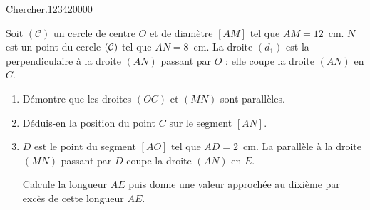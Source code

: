 \begin{pageAuto} 
 

  



 \begin{ExoAuto}{Chercher.}{1234}{2}{0}{0}{0}{0}
 
 

Soit $({\mathscr C})$ un cercle de centre $O$ et de diamètre $[AM]$ tel
que $AM=12$~cm. $N$ est un point du cercle $({\cal C})$ tel que
$AN=8$~cm. La droite $(d_1)$ est la perpendiculaire à la droite
$(AN)$ passant par $O$ : elle coupe la droite $(AN)$ en $C$.
\begin{enumerate}
\item Démontre que les droites $(OC)$ et $(MN)$ sont parallèles. 
\item Déduis-en la position du point $C$ sur le segment $[AN]$.
\item $D$ est le point du segment $[AO]$ tel que $AD=2$~cm. La
parallèle à la droite $(MN)$ passant par $D$ coupe la droite $(AN)$ en
$E$.\par Calcule la longueur $AE$ puis donne une valeur approchée au
dixième par excès de cette longueur $AE$.
\end{enumerate}

 
 \end{ExoAuto}
 
 
\end{pageAuto}


\begin{pageBrouillon} 
 



\end{pageBrouillon}